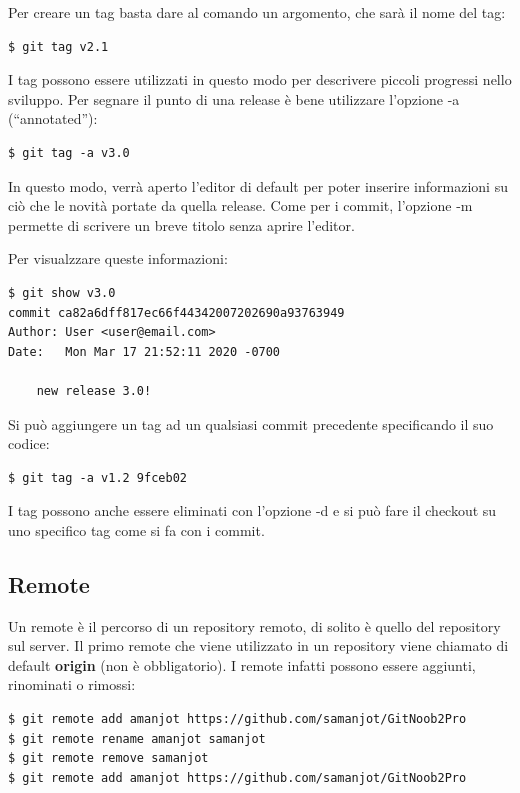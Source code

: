 \documentclass{article} \usepackage[textwidth=19cm,textheight=24cm]{geometry}
\begin{document}
Per creare un tag basta dare al comando un argomento, che sarà il nome del tag:

\begin{verbatim}
$ git tag v2.1
\end{verbatim}

I tag possono essere utilizzati in questo modo per descrivere piccoli progressi
nello sviluppo. Per segnare il punto di una release è bene utilizzare l'opzione
-a (``annotated''): 

\begin{verbatim}
$ git tag -a v3.0
\end{verbatim}

In questo modo, verrà aperto l'editor di default per poter inserire informazioni
su ciò che le novità portate da quella release. Come per i commit, l'opzione -m
permette di scrivere un breve titolo senza aprire l'editor.

Per visualzzare queste informazioni:

\begin{verbatim}
$ git show v3.0
commit ca82a6dff817ec66f44342007202690a93763949
Author: User <user@email.com>
Date:   Mon Mar 17 21:52:11 2020 -0700

    new release 3.0!
\end{verbatim}

Si può aggiungere un tag ad un qualsiasi commit precedente specificando il suo
codice:

\begin{verbatim}
$ git tag -a v1.2 9fceb02
\end{verbatim}

I tag possono anche essere eliminati con l'opzione -d e si può fare il checkout
su uno specifico tag come si fa con i commit.

\subsection{Remote\label{remoti}}

Un remote è il percorso di un repository remoto, di solito è quello del
repository sul server. Il primo remote che viene utilizzato in un repository
viene chiamato di default \textbf{origin} (non è obbligatorio). I remote infatti
possono essere aggiunti, rinominati o rimossi:

\begin{verbatim}
$ git remote add amanjot https://github.com/samanjot/GitNoob2Pro
$ git remote rename amanjot samanjot
$ git remote remove samanjot
$ git remote add amanjot https://github.com/samanjot/GitNoob2Pro
\end{verbatim}
\end{document}
